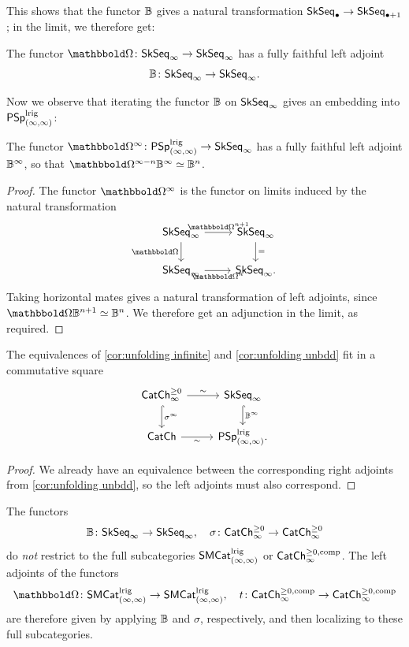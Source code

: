 \documentclass[a4paper,11pt]{article}
\begin{document}
This shows that the functor $\mathbb{B}$ gives a natural transformation
$\SkSeq_{\bullet} \to \SkSeq_{\bullet+1}$; in the limit, we therefore get:
\begin{cornoproof}
  The functor $\mOm \colon \SkSeq_{\infty} \to \SkSeq_{\infty}$ has a
  fully faithful left adjoint
  \[\mB \colon \SkSeq_{\infty} \to \SkSeq_{\infty}. \qedhere\]
\end{cornoproof}

Now we observe that iterating the functor $\mathbb{B}$ on $\textup{\textsf{SkSeq}}_{\infty}$
gives an embedding into $\textup{\textsf{PSp}}_{(\infty,\infty)}^{\text{\textup{lrig}}}$:
\begin{cor}
  The functor $\mOm^{\infty} \colon \PSpIIl \to \SkSeq_{\infty}$ has a fully faithful left adjoint
  $\mathbb{B}^{\infty}$, so that $\mOm^{\infty-n}\mB^{\infty} \simeq \mB^{n}$.
\end{cor}
\begin{proof}
  The functor $\mOm^{\infty}$ is the functor on limits induced by the
  natural transformation
  \[
    \begin{tikzcd}
      \SkSeq_{\infty} \ar[r, "\mOm^{n+1}"] \ar[d,
      "\mOm"'] & \SkSeq_{\infty}   \ar[d, "="] \\
      \SkSeq_{\infty}\ar[r, "\mOm^{n}"'] & \SkSeq_{\infty}.
    \end{tikzcd}
  \]
  Taking horizontal mates gives a natural transformation of left
  adjoints, since $\mOm\mB^{n+1} \simeq \mB^{n}$. We therefore get an
  adjunction in the limit, as required.
\end{proof}

\begin{propn}
  The equivalences of \cref{cor:unfolding infinite} and
  \cref{cor:unfolding unbdd} fit in a commutative square
  \[
    \begin{tikzcd}
     \CChp_{\infty} \ar[r, "\sim"] \ar[d, hookrightarrow, "\sigma^{\infty}"] &
     \SkSeq_{\infty}  \ar[d, hookrightarrow, "\mB^{\infty}"] \\
     \CCh \ar[r, "\sim"'] & \PSpIIl.
    \end{tikzcd}
  \]
\end{propn}
\begin{proof}
  We already have an equivalence between the corresponding right
  adjoints from \cref{cor:unfolding unbdd}, so the left adjoints must
  also correspond.
\end{proof}


\begin{warning}
  The functors \[\mB \colon \SkSeq_{\infty} \to \SkSeq_{\infty}, \quad
  \sigma \colon \CChp_{\infty} \to \CChp_{\infty}\] do \emph{not}
  restrict to the full subcategories $\textup{\textsf{SMCat}}_{(\infty,\infty)}^{\text{\textup{lrig}}}$ or $\textup{\textsf{CatCh}}^{\geq 0,\text{\textup{comp}}}_{\infty}$.
  The left adjoints of the functors \[\mOm \colon \SMCatII^{\lrig}
  \to \SMCatII^{\lrig}, \quad t \colon \CChpc_{\infty} \to
  \CChpc_{\infty}\] are therefore given by applying $\mathbb{B}$ and $\sigma$, respectively,
  and then localizing to these full subcategories.
\end{warning}
\end{document}
